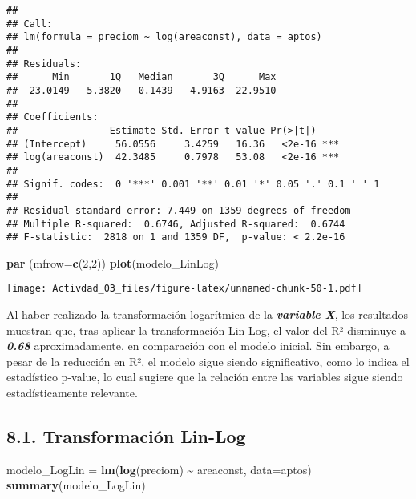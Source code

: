 \documentclass[
]{article}
\newenvironment{Shaded}{\begin{snugshade}}{\end{snugshade}}
\newcommand{\AttributeTok}[1]{\textcolor[rgb]{0.13,0.29,0.53}{#1}}
\newcommand{\DecValTok}[1]{\textcolor[rgb]{0.00,0.00,0.81}{#1}}
\newcommand{\FunctionTok}[1]{\textcolor[rgb]{0.13,0.29,0.53}{\textbf{#1}}}
\newcommand{\NormalTok}[1]{#1}
\newcommand{\OtherTok}[1]{\textcolor[rgb]{0.56,0.35,0.01}{#1}}
\newcommand{\SpecialCharTok}[1]{\textcolor[rgb]{0.81,0.36,0.00}{\textbf{#1}}}
\begin{document}
\begin{verbatim}
## 
## Call:
## lm(formula = preciom ~ log(areaconst), data = aptos)
## 
## Residuals:
##      Min       1Q   Median       3Q      Max 
## -23.0149  -5.3820  -0.1439   4.9163  22.9510 
## 
## Coefficients:
##                Estimate Std. Error t value Pr(>|t|)    
## (Intercept)     56.0556     3.4259   16.36   <2e-16 ***
## log(areaconst)  42.3485     0.7978   53.08   <2e-16 ***
## ---
## Signif. codes:  0 '***' 0.001 '**' 0.01 '*' 0.05 '.' 0.1 ' ' 1
## 
## Residual standard error: 7.449 on 1359 degrees of freedom
## Multiple R-squared:  0.6746, Adjusted R-squared:  0.6744 
## F-statistic:  2818 on 1 and 1359 DF,  p-value: < 2.2e-16
\end{verbatim}

\begin{Shaded}
\begin{Highlighting}[]
\FunctionTok{par}\NormalTok{ (}\AttributeTok{mfrow=}\FunctionTok{c}\NormalTok{(}\DecValTok{2}\NormalTok{,}\DecValTok{2}\NormalTok{))}
\FunctionTok{plot}\NormalTok{(modelo\_LinLog)}
\end{Highlighting}
\end{Shaded}

\texttt{[image: Activdad\_03\_files/figure-latex/unnamed-chunk-50-1.pdf]}

Al haber realizado la transformación logarítmica de la
\textbf{\emph{variable X}}, los resultados muestran que, tras aplicar la
transformación Lin-Log, el valor del R² disminuye a \textbf{\emph{0.68}}
aproximadamente, en comparación con el modelo inicial. Sin embargo, a
pesar de la reducción en R², el modelo sigue siendo significativo, como
lo indica el estadístico p-value, lo cual sugiere que la relación entre
las variables sigue siendo estadísticamente relevante.

\subsection{\texorpdfstring{\textbf{8.1. Transformación
Lin-Log}}{8.1. Transformación Lin-Log}}\label{transformaciuxf3n-lin-log-1}

\begin{Shaded}
\begin{Highlighting}[]
\NormalTok{modelo\_LogLin }\OtherTok{=} \FunctionTok{lm}\NormalTok{(}\FunctionTok{log}\NormalTok{(preciom) }\SpecialCharTok{\textasciitilde{}}\NormalTok{ areaconst, }\AttributeTok{data=}\NormalTok{aptos)      }
\FunctionTok{summary}\NormalTok{(modelo\_LogLin)}
\end{Highlighting}
\end{Shaded}
\end{document}
